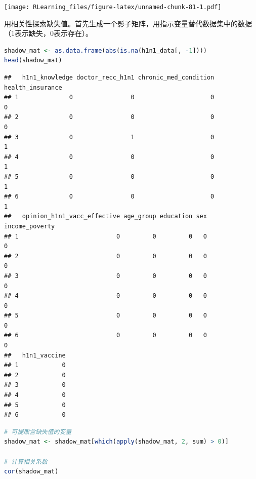 \documentclass[]{ctexbook}
\begin{document}
\texttt{[image: RLearning\_files/figure-latex/unnamed-chunk-81-1.pdf]}

用相关性探索缺失值。首先生成一个影子矩阵，用指示变量替代数据集中的数据（1表示缺失，0表示存在）。

\begin{lstlisting}[language=R]
shadow_mat <- as.data.frame(abs(is.na(h1n1_data[, -1])))
head(shadow_mat)
\end{lstlisting}

\begin{lstlisting}
##   h1n1_knowledge doctor_recc_h1n1 chronic_med_condition health_insurance
## 1              0                0                     0                0
## 2              0                0                     0                0
## 3              0                1                     0                1
## 4              0                0                     0                1
## 5              0                0                     0                1
## 6              0                0                     0                1
##   opinion_h1n1_vacc_effective age_group education sex income_poverty
## 1                           0         0         0   0              0
## 2                           0         0         0   0              0
## 3                           0         0         0   0              0
## 4                           0         0         0   0              0
## 5                           0         0         0   0              0
## 6                           0         0         0   0              0
##   h1n1_vaccine
## 1            0
## 2            0
## 3            0
## 4            0
## 5            0
## 6            0
\end{lstlisting}

\begin{lstlisting}[language=R]
# 可提取含缺失值的变量
shadow_mat <- shadow_mat[which(apply(shadow_mat, 2, sum) > 0)]

# 计算相关系数
cor(shadow_mat)
\end{lstlisting}
\end{document}
